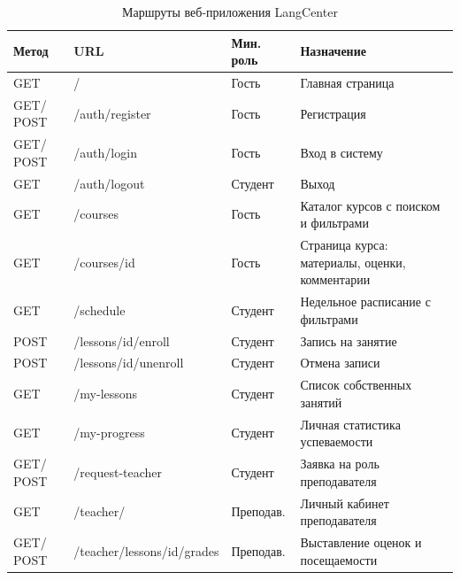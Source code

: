 \begin{table}[ht!]
    \centering
    \caption{Маршруты веб-приложения LangCenter}
    \label{tab:routes}
    \small
    \begin{tabularx}{\textwidth}{|p{1.5cm}|p{5.2cm}|p{2.4cm}|X|}
        \hline
        \textbf{Метод} & \textbf{URL} & \textbf{Мин. роль} & \textbf{Назначение} \\ \hline
        GET            & /                                          & Гость       & Главная страница \\ \hline
        GET/ POST       & /auth/register                             & Гость       & Регистрация \\ \hline
        GET/ POST       & /auth/login                                & Гость       & Вход в систему \\ \hline
        GET            & /auth/logout                               & Студент     & Выход \\ \hline
        GET            & /courses                                   & Гость       & Каталог курсов с поиском и фильтрами \\ \hline
        GET            & /courses/\textlangle{}id\textrangle{}      & Гость       & Страница курса: материалы, оценки, комментарии \\ \hline
        GET            & /schedule                                  & Студент     & Недельное расписание с фильтрами \\ \hline
        POST           & /lessons/\textlangle{}id\textrangle{}/enroll   & Студент & Запись на занятие \\ \hline
        POST           & /lessons/\textlangle{}id\textrangle{}/unenroll & Студент & Отмена записи \\ \hline
        GET            & /my-lessons                                & Студент     & Список собственных занятий \\ \hline
        GET            & /my-progress                               & Студент     & Личная статистика успеваемости \\ \hline
        GET/ POST       & /request-teacher                           & Студент     & Заявка на роль преподавателя \\ \hline
        GET            & /teacher/                                  & Преподав.   & Личный кабинет преподавателя \\ \hline
        GET/ POST       & /teacher/lessons/\textlangle{}id\textrangle{}/grades & Преподав. & Выставление оценок и посещаемости \\ \hline

\end{tabularx}
\end{table}
